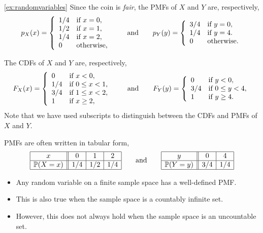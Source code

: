 \documentclass[lecture]{csm}
\newcommand{\prob}{\mathbb{P}}
\def\it{\item}
\def\bit{\begin{itemize}}
\def\eit{\end{itemize}}
\begin{document}
\break %

\begin{examplecont}{\ref{ex:randomvariables}}
Since the coin is \emph{fair}, the PMFs of $X$ and $Y$ are, respectively,
\[
p_X(x) = 
\left\{\begin{array}{ll}
1/4	& \text{if }x = 0, \\
1/2	& \text{if }x = 1, \\
1/4 & \text{if }x = 2, \\
0	& \text{otherwise,}
\end{array}\right.
\text{\qquad and\qquad}
p_Y(y) = 
\left\{\begin{array}{ll}
3/4	& \text{if }y = 0, \\
1/4	& \text{if }y = 4. \\
0	& \text{otherwise.}
\end{array}\right.
\]

The CDFs of $X$ and $Y$ are, respectively,
\[
F_X(x) =
\left\{\begin{array}{ll}
0	& \text{if }x < 0, \\
1/4	& \text{if }0\leq x < 1, \\
3/4	& \text{if }1\leq x < 2, \\
1   & \text{if }x \geq 2,
\end{array}\right.
\text{\qquad and\qquad}
F_Y(y) = 
\left\{\begin{array}{ll}
0	& \text{if }y < 0, \\
3/4	& \text{if }0\leq y  < 4, \\
1   & \text{if }y \geq 4.
\end{array}\right.
\]
Note that we have used subscripts to distinguish between the CDFs and PMFs of $X$ and $Y$.

\break %

PMFs are often written in tabular form, 
\[
\begin{array}{|c||c|c|c|}\hline
x			& 0		& 1		& 2 \\ \hline
\prob(X=x)	& 1/4	& 1/2	& 1/4 \\ \hline
\end{array}
\text{\qquad and\qquad}
\begin{array}{|c||c|c|c|}\hline
y			& 0		& 4		\\ \hline
\prob(Y=y)	& 3/4	& 1/4 	\\ \hline
\end{array}
\]
\end{examplecont}

\begin{remark}
\bit
\it Any random variable on a finite sample space has a well-defined PMF.
\it This is also true when the sample space is a countably infinite set.
\it However, this does not always hold when the sample space is an uncountable set.
\eit
\end{remark}
\end{document}
